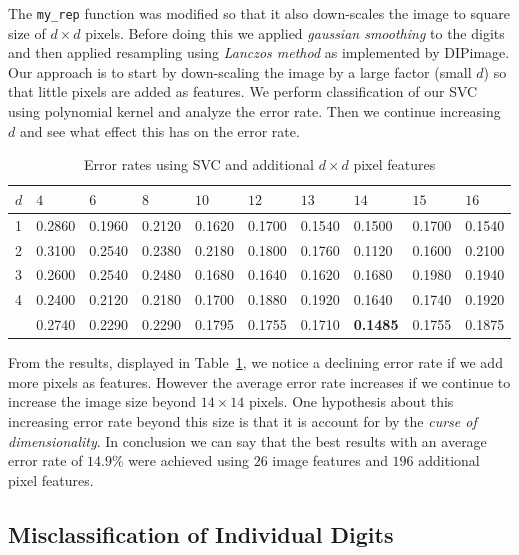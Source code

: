 \documentclass{article}
\begin{document}
The \texttt{my\_rep} function was modified so that it also down-scales the image to square size of $d \times d$ pixels. Before doing this we applied \emph{gaussian smoothing} to the digits and then applied resampling using \emph{Lanczos method} \cite{lanczos-filtering} as implemented by DIPimage. Our approach is to start by down-scaling the image by a large factor (small $d$) so that little pixels are added as features. We perform classification of our SVC using polynomial kernel and analyze the error rate. Then we continue increasing $d$ and see what effect this has on the error rate.

\begin{table}[H]
    \centering
    \begin{tabular}{|l|lllllllll|}
    \hline
    $d$ & $4$ & $6$ & $8$ & $10$ & $12$ & $13$ & $14$ & $15$ & $16$ \\
    \hline
    1 & 0.2860 & 0.1960 & 0.2120 & 0.1620 & 0.1700 & 0.1540 & 0.1500 & 0.1700 & 0.1540 \\
    2 & 0.3100 & 0.2540 & 0.2380 & 0.2180 & 0.1800 & 0.1760 & 0.1120 & 0.1600 & 0.2100 \\
    3 & 0.2600 & 0.2540 & 0.2480 & 0.1680 & 0.1640 & 0.1620 & 0.1680 & 0.1980 & 0.1940 \\
    4 & 0.2400 & 0.2120 & 0.2180 & 0.1700 & 0.1880 & 0.1920 & 0.1640 & 0.1740 & 0.1920 \\
    \hline
      & 0.2740 & 0.2290 & 0.2290 & 0.1795 & 0.1755 & 0.1710 & \textbf{0.1485} & 0.1755 & 0.1875 \\ 
    \hline
    \end{tabular}
    \caption{Error rates using SVC and additional $d \times d$ pixel features \label{tab:svc-adding-pixel-features}}
\end{table}

From the results, displayed in Table~\ref{tab:svc-adding-pixel-features}, we notice a declining error rate if we add more pixels as features. However the average error rate increases if we continue to increase the image size beyond $14 \times 14$ pixels. One hypothesis about this increasing error rate beyond this size is that it is account for by the \emph{curse of dimensionality}. In conclusion we can say that the best results with an average error rate of $\mathbf{14.9 \%}$ were achieved using $26$ image features and $196$ additional pixel features. 

\subsection{Misclassification of Individual Digits}
\end{document}
